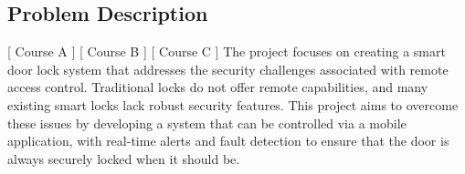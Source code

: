 \subsection{Problem Description}
[ Course A ] [ Course B ] [ Course C ]
\newline
The project focuses on creating a smart door lock system that addresses the security challenges associated with remote access control. Traditional locks do not offer remote capabilities, and many existing smart locks lack robust security features. This project aims to overcome these issues by developing a system that can be controlled via a mobile application, with real-time alerts and fault detection to ensure that the door is always securely locked when it should be.
